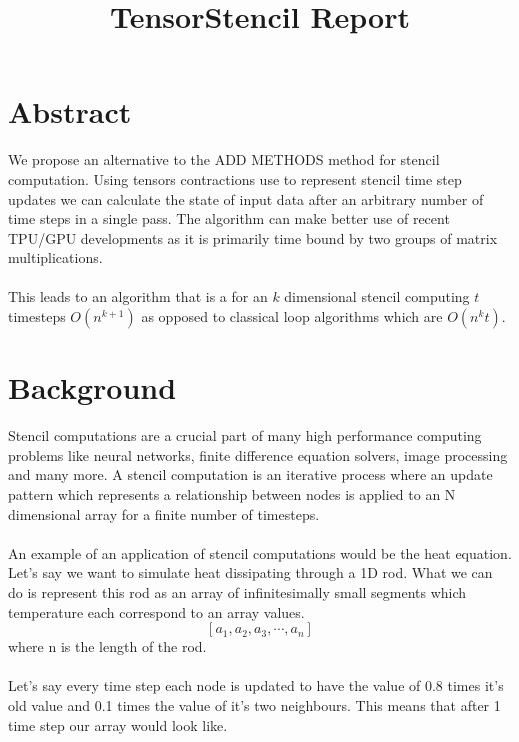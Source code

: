 \documentclass{article}
\begin{document}

\title{TensorStencil Report}


\maketitle





\section{Abstract}
We propose an alternative to the ADD METHODS method for stencil computation.
Using tensors contractions use to represent stencil time step updates we can calculate the state of input data after an arbitrary number of time steps in a single pass.
The algorithm can make better use of recent TPU/GPU developments as it is primarily time bound by two groups of matrix multiplications.
\\ \\ This leads to an algorithm that is a for an $k$ dimensional stencil computing $t$ timesteps $O(n^{k+1})$ as opposed to classical loop algorithms which are $O(n^{k}t)$.

\section{Background}

Stencil computations are a crucial part of many high performance computing problems like neural networks, finite difference equation solvers, image processing and many more.
A stencil computation is an iterative process where an update pattern which represents a relationship between nodes is applied to an N dimensional array for a finite number of timesteps.
\\ \\ An example of an application of stencil computations would be the heat equation. 
Let's say we want to simulate heat dissipating through a 1D rod. 
What we can do is represent this rod as an array of infinitesimally small segments which temperature each correspond to an array values. \\ 
\[ [a_1,a_2,a_3,\cdots,a_n]\] 
where n is the length of the rod. \\ \\
Let's say every time step each node is updated to have the value of 0.8 times it's old value and 0.1 times the value of it's two neighbours.
This means that after 1 time step our array would look like.
\end{document}
